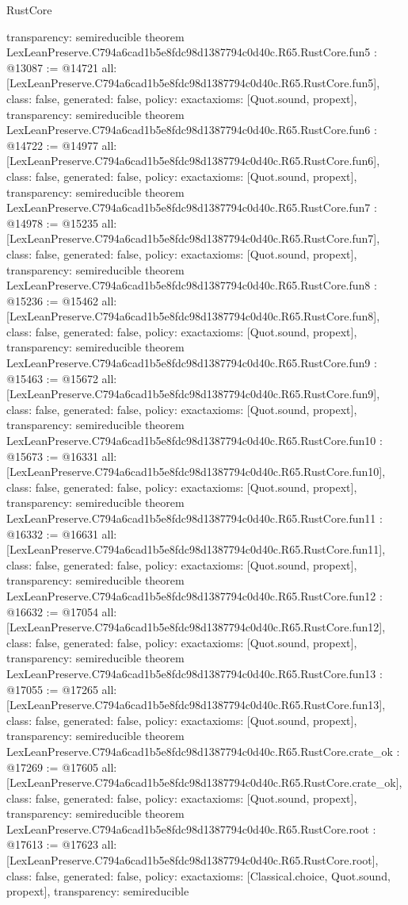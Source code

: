\begin{lexlean}{RustCore}
\begin{coremodule}
{  transparency: semireducible
}
theorem LexLeanPreserve.C794a6cad1b5e8fdc98d1387794c0d40c.R65.RustCore.fun5 : @13087 := @14721 {
  all: [LexLeanPreserve.C794a6cad1b5e8fdc98d1387794c0d40c.R65.RustCore.fun5],
  class: false,
  generated: false,
  policy: exact{axioms: [Quot.sound, propext]},
  transparency: semireducible
}
theorem LexLeanPreserve.C794a6cad1b5e8fdc98d1387794c0d40c.R65.RustCore.fun6 : @14722 := @14977 {
  all: [LexLeanPreserve.C794a6cad1b5e8fdc98d1387794c0d40c.R65.RustCore.fun6],
  class: false,
  generated: false,
  policy: exact{axioms: [Quot.sound, propext]},
  transparency: semireducible
}
theorem LexLeanPreserve.C794a6cad1b5e8fdc98d1387794c0d40c.R65.RustCore.fun7 : @14978 := @15235 {
  all: [LexLeanPreserve.C794a6cad1b5e8fdc98d1387794c0d40c.R65.RustCore.fun7],
  class: false,
  generated: false,
  policy: exact{axioms: [Quot.sound, propext]},
  transparency: semireducible
}
theorem LexLeanPreserve.C794a6cad1b5e8fdc98d1387794c0d40c.R65.RustCore.fun8 : @15236 := @15462 {
  all: [LexLeanPreserve.C794a6cad1b5e8fdc98d1387794c0d40c.R65.RustCore.fun8],
  class: false,
  generated: false,
  policy: exact{axioms: [Quot.sound, propext]},
  transparency: semireducible
}
theorem LexLeanPreserve.C794a6cad1b5e8fdc98d1387794c0d40c.R65.RustCore.fun9 : @15463 := @15672 {
  all: [LexLeanPreserve.C794a6cad1b5e8fdc98d1387794c0d40c.R65.RustCore.fun9],
  class: false,
  generated: false,
  policy: exact{axioms: [Quot.sound, propext]},
  transparency: semireducible
}
theorem LexLeanPreserve.C794a6cad1b5e8fdc98d1387794c0d40c.R65.RustCore.fun10 : @15673 := @16331 {
  all: [LexLeanPreserve.C794a6cad1b5e8fdc98d1387794c0d40c.R65.RustCore.fun10],
  class: false,
  generated: false,
  policy: exact{axioms: [Quot.sound, propext]},
  transparency: semireducible
}
theorem LexLeanPreserve.C794a6cad1b5e8fdc98d1387794c0d40c.R65.RustCore.fun11 : @16332 := @16631 {
  all: [LexLeanPreserve.C794a6cad1b5e8fdc98d1387794c0d40c.R65.RustCore.fun11],
  class: false,
  generated: false,
  policy: exact{axioms: [Quot.sound, propext]},
  transparency: semireducible
}
theorem LexLeanPreserve.C794a6cad1b5e8fdc98d1387794c0d40c.R65.RustCore.fun12 : @16632 := @17054 {
  all: [LexLeanPreserve.C794a6cad1b5e8fdc98d1387794c0d40c.R65.RustCore.fun12],
  class: false,
  generated: false,
  policy: exact{axioms: [Quot.sound, propext]},
  transparency: semireducible
}
theorem LexLeanPreserve.C794a6cad1b5e8fdc98d1387794c0d40c.R65.RustCore.fun13 : @17055 := @17265 {
  all: [LexLeanPreserve.C794a6cad1b5e8fdc98d1387794c0d40c.R65.RustCore.fun13],
  class: false,
  generated: false,
  policy: exact{axioms: [Quot.sound, propext]},
  transparency: semireducible
}
theorem LexLeanPreserve.C794a6cad1b5e8fdc98d1387794c0d40c.R65.RustCore.crate_ok : @17269 := @17605 {
  all: [LexLeanPreserve.C794a6cad1b5e8fdc98d1387794c0d40c.R65.RustCore.crate_ok],
  class: false,
  generated: false,
  policy: exact{axioms: [Quot.sound, propext]},
  transparency: semireducible
}
theorem LexLeanPreserve.C794a6cad1b5e8fdc98d1387794c0d40c.R65.RustCore.root : @17613 := @17623 {
  all: [LexLeanPreserve.C794a6cad1b5e8fdc98d1387794c0d40c.R65.RustCore.root],
  class: false,
  generated: false,
  policy: exact{axioms: [Classical.choice, Quot.sound, propext]},
  transparency: semireducible
}


\end{coremodule}
\end{lexlean}
